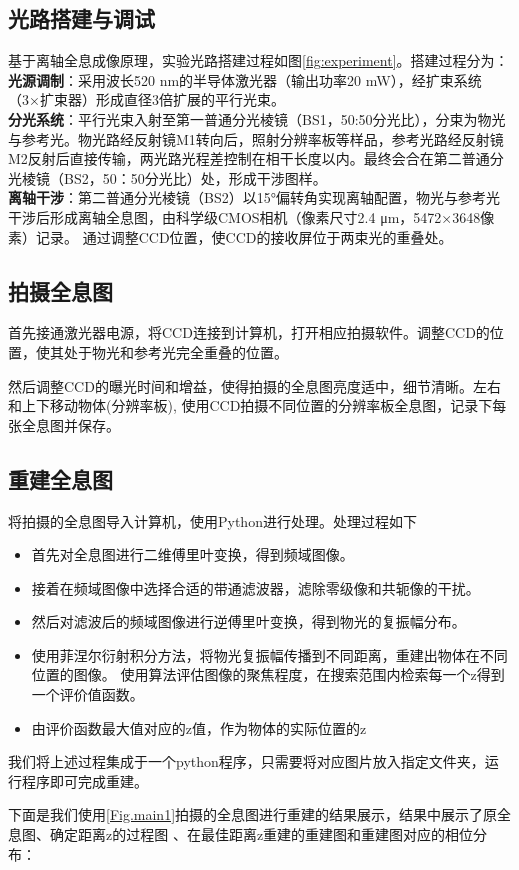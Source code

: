\documentclass[a4paper]{report}
\begin{document}
\subsection{光路搭建与调试}
基于离轴全息成像原理，实验光路搭建过程如图\ref{fig:experiment}。搭建过程分为：\\
\textbf{光源调制}：采用波长520 nm的半导体激光器（输出功率20 mW），经扩束系统（3×扩束器）形成直径3倍扩展的平行光束。\\
\textbf{分光系统}：平行光束入射至第一普通分光棱镜（BS1，50:50分光比），分束为物光与参考光。物光路经反射镜M1转向后，照射分辨率板等样品，参考光路经反射镜M2反射后直接传输，两光路光程差控制在相干长度以内。最终会合在第二普通分光棱镜（BS2，50：50分光比）处，形成干涉图样。\\
\textbf{离轴干涉}：第二普通分光棱镜（BS2）以15°偏转角实现离轴配置，物光与参考光干涉后形成离轴全息图，由科学级CMOS相机（像素尺寸2.4 μm，5472×3648像素）记录。
通过调整CCD位置，使CCD的接收屏位于两束光的重叠处。
\subsection{拍摄全息图}
首先接通激光器电源，将CCD连接到计算机，打开相应拍摄软件。调整CCD的位置，使其处于物光和参考光完全重叠的位置。
\par
然后调整CCD的曝光时间和增益，使得拍摄的全息图亮度适中，细节清晰。左右和上下移动物体(分辨率板),
使用CCD拍摄不同位置的分辨率板全息图，记录下每张全息图并保存。

\subsection{重建全息图}
将拍摄的全息图导入计算机，使用Python进行处理。处理过程如下
\begin{itemize}
    \item 首先对全息图进行二维傅里叶变换，得到频域图像。
    \item 接着在频域图像中选择合适的带通滤波器，滤除零级像和共轭像的干扰。
    \item 然后对滤波后的频域图像进行逆傅里叶变换，得到物光的复振幅分布。
    \item 使用菲涅尔衍射积分方法，将物光复振幅传播到不同距离，重建出物体在不同位置的图像。
    使用算法评估图像的聚焦程度，在搜索范围内检索每一个z得到一个评价值函数。
    \item 由评价函数最大值对应的z值，作为物体的实际位置的z
\end{itemize}
我们将上述过程集成于一个python程序，只需要将对应图片放入指定文件夹，运行程序即可完成重建。
\par
下面是我们使用\ref{Fig.main1}拍摄的全息图进行重建的结果展示，结果中展示了原全息图、确定距离z的过程图
、在最佳距离z重建的重建图和重建图对应的相位分布：
\end{document}
